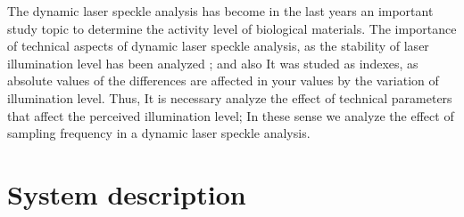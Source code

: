 \documentclass[review]{elsarticle}
\begin{document}
The dynamic laser speckle analysis has become in the last years  an important
study topic\cite{catalano2019viability,rivera2019sound,gonzalez2018diode,Silva2018,braga2017dynamic} 
to determine the  activity level of biological materials. 
The importance of technical aspects of dynamic laser speckle analysis,
as the stability of laser illumination level has been  analyzed \cite{gonzalez2018diode}; 
and also It was studed as indexes,
as absolute values of the differences \cite{cardoso2014,rivera2017selection} are affected in your values
by the variation of illumination level. Thus, It is necessary analyze the effect
of technical parameters that affect the perceived illumination level; In these sense
we analyze the effect of sampling frequency in a dynamic laser speckle analysis. 





\section{System description}
\label{sec:description}
\end{document}
